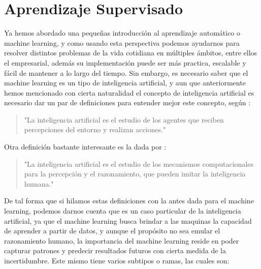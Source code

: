 \section{Aprendizaje Supervisado}

Ya hemos abordado una pequeñas introducción al aprendizaje automático o machine learning, y como usando esta perspectiva podemos ayudarnos para resolver distintos problemas de la vida cotidiana en múltiples ámbitos, entre ellos el empresarial, además su implementación puede ser más practica, escalable y fácil de mantener a lo largo del tiempo. Sin embargo, es necesario saber que el machine learning es un tipo de inteligencia artificial, y aun que anteriormente hemos mencionado con cierta naturalidad el concepto de inteligencia artificial es necesario dar un par de definiciones para entender mejor este concepto, según \citealp{Russell2020}:


\begin{quote}
	\small
	"La inteligencia artificial es el estudio de los agentes que reciben percepciones del entorno y realizan acciones."
	
	\begin{flushright}
		\citet[p. 1]{Russell2020}
	\end{flushright}
\end{quote}

Otra definición bastante interesante es la dada por \citealp{luger2005ai}:

\begin{quote}
	\small
	"La inteligencia artificial es el estudio de los mecanismos computacionales para la percepción y el razonamiento, que pueden imitar la inteligencia humana."
	
	\begin{flushright}
		\citet{luger2005ai}
	\end{flushright}
\end{quote}

De tal forma que si hilamos estas definiciones con la antes dada para el machine learning, podemos darnos cuenta que es un caso particular de la inteligencia artificial, ya que el machine learning busca brindar a las maquinas la capacidad de aprender a partir de datos, y aunque el propósito no sea emular el razonamiento humano, la importancia del machine learning reside en poder capturar patrones y predecir resultados futuros con cierta medida de la incertidumbre. Este mismo tiene varios subtipos o ramas, las cuales son:

